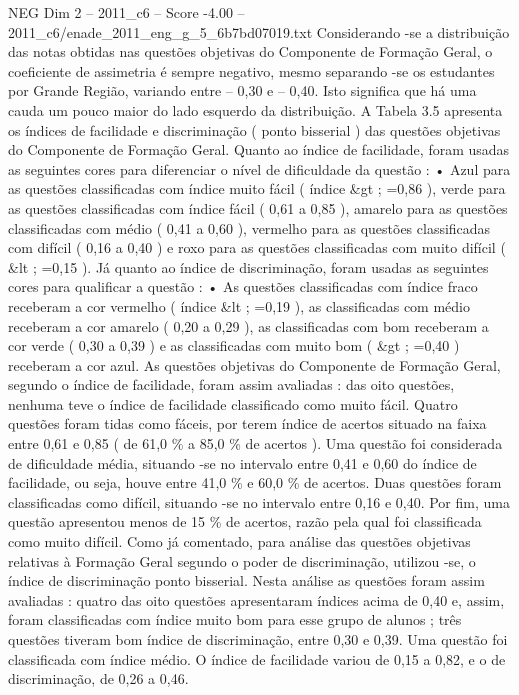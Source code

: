 \begin{textsample}{NEG Dim 2 – 2011\_c6 – Score -4.00 – 2011\_c6/enade\_2011\_eng\_g\_5\_6b7bd07019.txt}
Considerando -se a distribuição das notas obtidas nas questões objetivas do Componente de Formação Geral, o coeficiente de assimetria é sempre negativo, mesmo separando -se os estudantes por Grande Região, variando entre – 0,30 e – 0,40.
Isto significa que há uma cauda um pouco maior do lado esquerdo da distribuição.
A Tabela 3.5 apresenta os índices de facilidade e discriminação ( ponto bisserial ) das questões objetivas do Componente de Formação Geral.
Quanto ao índice de facilidade, foram usadas as seguintes cores para diferenciar o nível de dificuldade da questão : • Azul para as questões classificadas com índice muito fácil ( índice \&gt ; =0,86 ), verde para as questões classificadas com índice fácil ( 0,61 a 0,85 ), amarelo para as questões classificadas com médio ( 0,41 a 0,60 ), vermelho para as questões classificadas com difícil ( 0,16 a 0,40 ) e roxo para as questões classificadas com muito difícil ( \&lt ; =0,15 ).
Já quanto ao índice de discriminação, foram usadas as seguintes cores para qualificar a questão : • As questões classificadas com índice fraco receberam a cor vermelho ( índice \&lt ; =0,19 ), as classificadas com médio receberam a cor amarelo ( 0,20 a 0,29 ), as classificadas com bom receberam a cor verde ( 0,30 a 0,39 ) e as classificadas com muito bom ( \&gt ; =0,40 ) receberam a cor azul.
As questões objetivas do Componente de Formação Geral, segundo o índice de facilidade, foram assim avaliadas : das oito questões, nenhuma teve o índice de facilidade classificado como muito fácil.
Quatro questões foram tidas como fáceis, por terem índice de acertos situado na faixa entre 0,61 e 0,85 ( de 61,0 \% a 85,0 \% de acertos ).
Uma questão foi considerada de dificuldade média, situando -se no intervalo entre 0,41 e 0,60 do índice de facilidade, ou seja, houve entre 41,0 \% e 60,0 \% de acertos.
Duas questões foram classificadas como difícil, situando -se no intervalo entre 0,16 e 0,40.
Por fim, uma questão apresentou menos de 15 \% de acertos, razão pela qual foi classificada como muito difícil.
Como já comentado, para análise das questões objetivas relativas à Formação Geral segundo o poder de discriminação, utilizou -se, o índice de discriminação ponto bisserial.
Nesta análise as questões foram assim avaliadas : quatro das oito questões apresentaram índices acima de 0,40 e, assim, foram classificadas com índice muito bom para esse grupo de alunos ; três questões tiveram bom índice de discriminação, entre 0,30 e 0,39.
Uma questão foi classificada com índice médio.
O índice de facilidade variou de 0,15 a 0,82, e o de discriminação, de 0,26 a 0,46.

\end{textsample}
